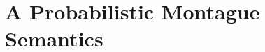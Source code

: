 \documentclass[11pt]{article}
\theoremstyle{definition}
\begin{document}






\section{A Probabilistic Montague Semantics}
\end{document}

